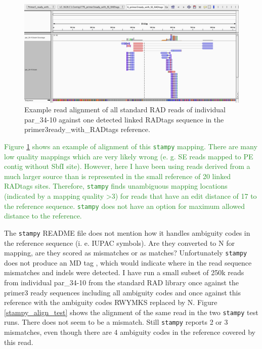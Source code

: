 \documentclass{article}\usepackage[]{graphicx}\usepackage[]{color}
\newcommand{\roger}[1]{ \textcolor[named]{ForestGreen}{#1} }
\begin{document}
\begin{figure}
\centering
\includegraphics[width=\textwidth]{./figure/stampy_par_34-10_vs_primer3ready_igv}
\caption{Example read alignment of all standard RAD reads of individual par\_34-10 against one detected linked RADtags sequence in the primer3ready\_with\_RADtags reference.}
\label{stampy_par_34-10_vs_primer3ready_igv}
\end{figure}

\roger{Figure \ref{stampy_par_34-10_vs_primer3ready_igv} shows an example of alignment of this \texttt{stampy} mapping. There are many low quality mappings which are very likely wrong (e. g. SE reads mapped to PE contig without SbfI site). However, here I have been using reads derived from a much larger source than is represented in the small reference of 20 linked RADtags sites. Therefore, \texttt{stampy} finds unambiguous mapping locations (indicated by a mapping quality >3) for reads that have an edit distance of 17 to the reference sequence. \texttt{stampy} does not have an option for maximum allowed distance to the reference.}

The \texttt{stampy} README file does not mention how it handles ambiguity codes in the reference sequence (i. e. IUPAC symbols). Are they converted to N for mapping, are they scored as mismatches or as matches? Unfortunately \texttt{stampy} does not produce an MD tag \citep[p. 6]{SAMformatSpec2011}, which would indicate where in the read sequence mismatches and indels were detected. I have run a small subset of 250k reads from individual par\_34-10 from the standard RAD library once against the primer3 ready sequences including all ambiguity codes and once against this reference with the ambiguity codes RWYMKS replaced by N. Figure \ref{stampy_align_test} shows the alignment of the same read in the two \texttt{stampy} test runs. There does not seem to be a mismatch. Still \texttt{stampy} reports 2 or 3 mismatches, even though there are 4 ambiguity codes in the reference covered by this read.
\end{document}
